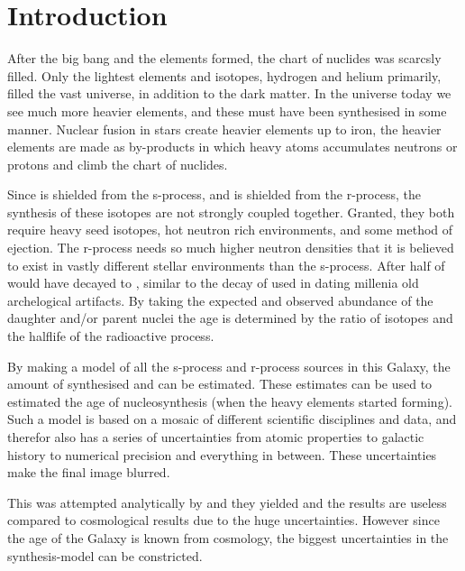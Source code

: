 \chapter{Introduction}
\label{sec:introduction}

After the big bang and the elements formed, the chart of nuclides was scarcsly filled.
Only the lightest elements and isotopes, hydrogen and helium primarily, filled the vast universe\cite{alphabetagamma}, in addition to the dark matter.
In the universe today we see much more heavier elements, and these must have been synthesised in some manner.
Nuclear fusion in stars create heavier elements up to iron, the heavier elements are made as by-products in which heavy atoms accumulates neutrons or protons and climb the chart of nuclides\cite{BBFH}.

Since  is shielded from the s-process, and  is shielded from the r-process, the synthesis of these isotopes are not
strongly coupled together. Granted, they both require heavy seed isotopes, hot neutron rich environments, and some method of ejection. The r-process needs so much higher neutron densities that it is believed to exist in vastly different stellar environments than the s-process.
After  half of  would have decayed to , similar to the decay of  used in dating millenia old archelogical artifacts.
By taking the expected and observed abundance of the daughter and/or parent nuclei the age is determined by the ratio of isotopes and the halflife of the radioactive process.

By making a model of all the s-process and r-process sources in this Galaxy, the amount of synthesised  and  can be estimated. These estimates can be used to estimated the age of nucleosynthesis (when the heavy elements started forming).
Such a model is based on a mosaic of different scientific disciplines and data, and therefor also has a series of uncertainties from atomic properties to galactic history to numerical precision and everything in between. These uncertainties make the final image blurred.

This was attempted analytically by  and they yielded  and the results are useless compared to cosmological results  due to the huge uncertainties. However since the age of the Galaxy is known from cosmology, the biggest uncertainties in the synthesis-model can be constricted.

